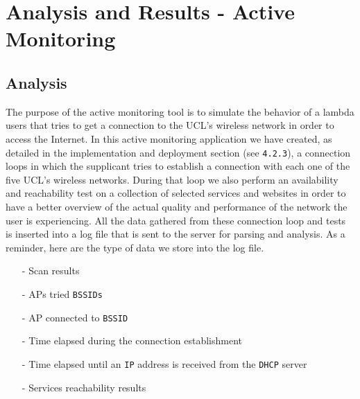 
\chapter{Analysis and Results - Active Monitoring} %

\label{Chapter6} %





\section{Analysis}
The purpose of the active monitoring tool is to simulate the behavior of a lambda users that tries to get a connection to the UCL's wireless network in order to access the Internet. In this active monitoring application we have created, as detailed in the implementation and deployment section (see \texttt{4.2.3}), a connection loops in which the supplicant tries to establish a connection with each one of the five UCL's wireless networks. During that loop we also perform an availability and reachability test on a collection of selected services and websites in order to have a better overview of the actual quality and performance of the network the user is experiencing. All the data gathered from these connection loop and tests is inserted into a log file that is sent to the server for parsing and analysis. As a reminder, here are the type of data we store into the log file.

\begin{itemize}
	\item [-] Scan results
	\item [-] APs tried \texttt{BSSIDs}
	\item [-] AP connected to \texttt{BSSID}
	\item [-] Time elapsed during the connection establishment
	\item [-] Time elapsed until an \texttt{IP} address is received from the \texttt{DHCP} server
	\item [-] Services reachability results
\end{itemize}

